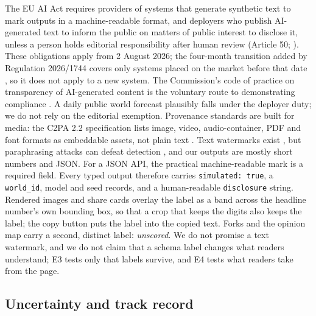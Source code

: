 \documentclass[11pt]{article}
\begin{document}
The EU AI Act requires providers of systems that generate synthetic text to mark outputs in a machine-readable format, and deployers who publish AI-generated text to inform the public on matters of public interest to disclose it, unless a person holds editorial responsibility after human review (Article 50; \citealp{euaiact2024}). These obligations apply from 2 August 2026; the four-month transition added by Regulation 2026/1744 covers only systems placed on the market before that date \citep{euomnibus2026}, so it does not apply to a new system. The Commission's code of practice on transparency of AI-generated content is the voluntary route to demonstrating compliance \citep{eucodeofpractice2026}. A daily public world forecast plausibly falls under the deployer duty; we do not rely on the editorial exemption. Provenance standards are built for media: the C2PA 2.2 specification lists image, video, audio-container, PDF and font formats as embeddable assets, not plain text \citep{c2pa2025spec}. Text watermarks exist \citep{kirchenbauer2023watermark}, but paraphrasing attacks can defeat detection \citep{sadasivan2023detected}, and our outputs are mostly short numbers and JSON. For a JSON API, the practical machine-readable mark is a required field. Every typed output therefore carries \texttt{simulated: true}, a \texttt{world\_id}, model and seed records, and a human-readable \texttt{disclosure} string. Rendered images and share cards overlay the label as a band across the headline number's own bounding box, so that a crop that keeps the digits also keeps the label; the copy button puts the label into the copied text. Forks and the opinion map carry a second, distinct label: \emph{unscored}. We do not promise a text watermark, and we do not claim that a schema label changes what readers understand; E3 tests only that labels survive, and E4 tests what readers take from the page.

\subsection{Uncertainty and track record}
\label{sec:uncertainty}
\end{document}
